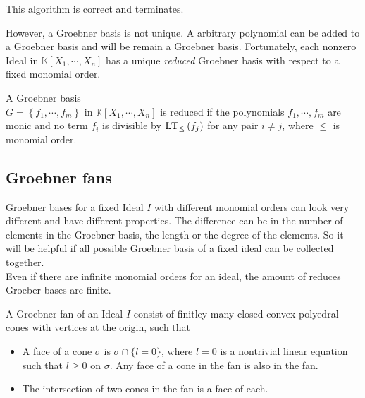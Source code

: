 This algorithm is correct and terminates.\cite{KHZ}

\newpage

However, a Groebner basis is not unique. A arbitrary polynomial can be added to a Groebner basis and will be remain a Groebner basis.
Fortunately, each nonzero Ideal in $\mathbb{K}\left[X_{1}, \cdots, X_{n}\right]$ has a unique \textit{reduced} Groebner basis with respect to a fixed monomial order.

\begin{env_definition}
\cite{KHZ}
A Groebner basis \\ $G= \left\lbrace  f_{1}, \cdots , f_{m} \right\rbrace  $ in 
$ \mathbb{K}\left[X_{1}, \cdots, X_{n}\right] $ is reduced if the polynomials $f_{1},\cdots , f_{m} $ are monic and no term $f_{i}$ is divisible by $ \textsc{LT}_{\leq }\left( f_{j}\right)$ for any pair $i\neq j$, where $\leq$ is monomial order.
\end{env_definition}


\subsection{Groebner fans}
\label{subsec:Groebnerfan}
 Groebner bases for a fixed Ideal $I$ with different monomial orders can look very different and have different properties. The difference can be in the number of elements in the Groebner basis, the length or the degree of the elements. So it will be helpful if all 
possible Groebner basis of a fixed ideal can be collected together.\\
Even if there are infinite monomial orders for an ideal, the amount of reduces Groeber bases are finite. \cite{coxOshea}
 
\begin{env_definition}
\cite{coxOshea} A Groebner fan of an Ideal $I$ consist of finitley many closed convex polyedral cones with vertices at the origin, such that

\begin{itemize}
\item
A face of a cone $\sigma$ is $\sigma \cap \lbrace l=0\rbrace$, where $l=0$ is a nontrivial linear equation such that $l \geq 0$ on $\sigma$.
Any face of a cone in the fan is also in the fan.
\item
The intersection of two cones in the fan is a face of each.
\end{itemize}

\end{env_definition}

